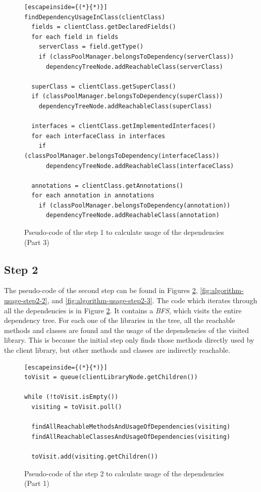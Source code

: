 \begin{figure}[ht!]
\begin{lstlisting}[escapeinside={(*}{*)}]
findDependencyUsageInClass(clientClass)
  fields = clientClass.getDeclaredFields()
  for each field in fields
    serverClass = field.getType()
    if (classPoolManager.belongsToDependency(serverClass))
      dependencyTreeNode.addReachableClass(serverClass)

  superClass = clientClass.getSuperClass()
  if (classPoolManager.belongsToDependency(superClass))
    dependencyTreeNode.addReachableClass(superClass)

  interfaces = clientClass.getImplementedInterfaces()
  for each interfaceClass in interfaces
    if (classPoolManager.belongsToDependency(interfaceClass))
      dependencyTreeNode.addReachableClass(interfaceClass)

  annotations = clientClass.getAnnotations()
  for each annotation in annotations
    if (classPoolManager.belongsToDependency(annotation))
      dependencyTreeNode.addReachableClass(annotation)
\end{lstlisting}
\caption{Pseudo-code of the step 1 to calculate usage of the dependencies (Part 3)}
\label{fig:algorithm-usage-step1-3}
\end{figure}

\subsection{Step 2}
The pseudo-code of the second step can be found in Figures \ref{fig:algorithm-usage-step2-1}, \ref{fig:algorithm-usage-step2-2}, and \ref{fig:algorithm-usage-step2-3}. The code which iterates through all the dependencies is in Figure \ref{fig:algorithm-usage-step2-1}. It contains a \textit{BFS}, which visits the entire dependency tree. For each one of the libraries in the tree, all the reachable methods and classes are found and the usage of the dependencies of the visited library. This is because the initial step only finds those methods directly used by the client library, but other methods and classes are indirectly reachable.

\begin{figure}[ht!]
\begin{lstlisting}[escapeinside={(*}{*)}]
toVisit = queue(clientLibraryNode.getChildren())

while (!toVisit.isEmpty())
  visiting = toVisit.poll()

  findAllReachableMethodsAndUsageOfDependencies(visiting)
  findAllReachableClassesAndUsageOfDependencies(visiting)

  toVisit.add(visiting.getChildren())
\end{lstlisting}
\caption{Pseudo-code of the step 2 to calculate usage of the dependencies (Part 1)}
\label{fig:algorithm-usage-step2-1}
\end{figure}

